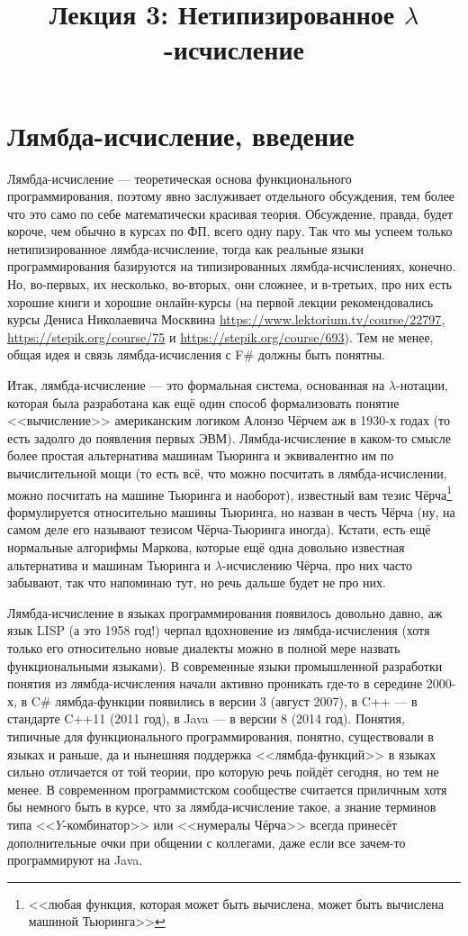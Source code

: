 \documentclass[a5paper]{article}
\title{Лекция 3: Нетипизированное $\lambda$-исчисление}
\date{}
\begin{document}
\maketitle
\thispagestyle{empty}

\section{Лямбда-исчисление, введение}

Лямбда-исчисление --- теоретическая основа функционального программирования, поэтому явно заслуживает отдельного обсуждения, тем более что это само по себе математически красивая теория. Обсуждение, правда, будет короче, чем обычно в курсах по ФП, всего одну пару. Так что мы успеем только нетипизированное лямбда-исчисление, тогда как реальные языки программирования базируются на типизированных лямбда-исчислениях, конечно. Но, во-первых, их несколько, во-вторых, они сложнее, и в-третьих, про них есть хорошие книги и хорошие онлайн-курсы (на первой лекции рекомендовались курсы Дениса Николаевича Москвина \url{https://www.lektorium.tv/course/22797}, \url{https://stepik.org/course/75} и \url{https://stepik.org/course/693}). Тем не менее, общая идея и связь лямбда-исчисления с F\# должны быть понятны.

Итак, лямбда-исчисление --- это формальная система, основанная на $\lambda$-нотации, которая была разработана как ещё один способ формализовать понятие <<вычисление>> американским логиком Алонзо Чёрчем аж в 1930-х годах (то есть задолго до появления первых ЭВМ). Лямбда-исчисление в каком-то смысле более простая альтернатива машинам Тьюринга и эквивалентно им по вычислительной мощи (то есть всё, что можно посчитать в лямбда-исчислении, можно посчитать на машине Тьюринга и наоборот), известный вам тезис Чёрча\footnote{<<любая функция, которая может быть вычислена, может быть вычислена машиной Тьюринга>>} формулируется относительно машины Тьюринга, но назван в честь Чёрча (ну, на самом деле его называют тезисом Чёрча-Тьюринга иногда). Кстати, есть ещё нормальные алгорифмы Маркова, которые ещё одна довольно известная альтернатива и машинам Тьюринга и $\lambda$-исчислению Чёрча, про них часто забывают, так что напоминаю тут, но речь дальше будет не про них.

Лямбда-исчисление в языках программирования появилось довольно давно, аж язык LISP (а это 1958 год!) черпал вдохновение из лямбда-исчисления (хотя только его относительно новые диалекты можно в полной мере назвать функциональными языками). В современные языки промышленной разработки понятия из лямбда-исчисления начали активно проникать где-то в середине 2000-х, в C\# лямбда-функции появились в версии 3 (август 2007), в C++ --- в стандарте C++11 (2011 год), в Java --- в версии 8 (2014 год). Понятия, типичные для функционального программирования, понятно, существовали в языках и раньше, да и нынешняя поддержка <<лямбда-функций>> в языках сильно отличается от той теории, про которую речь пойдёт сегодня, но тем не менее. В современном программистском сообществе считается приличным хотя бы немного быть в курсе, что за лямбда-исчисление такое, а знание терминов типа <<$Y$-комбинатор>> или <<нумералы Чёрча>> всегда принесёт дополнительные очки при общении с коллегами, даже если все зачем-то программируют на Java.
\end{document}
